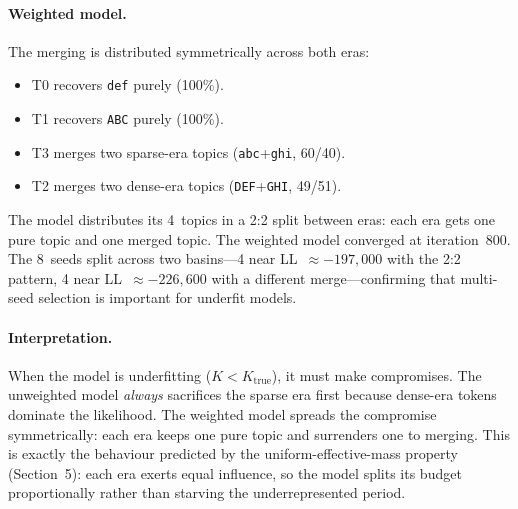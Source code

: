 \documentclass[11pt]{article}
\begin{document}
\paragraph{Weighted model.}
The merging is distributed symmetrically across both eras:
\begin{itemize}
\item T0 recovers \texttt{def} purely (100\%).
\item T1 recovers \texttt{ABC} purely (100\%).
\item T3 merges two sparse-era topics (\texttt{abc}\;+\;\texttt{ghi}, 60/40).
\item T2 merges two dense-era topics (\texttt{DEF}\;+\;\texttt{GHI}, 49/51).
\end{itemize}
The model distributes its 4~topics in a 2:2 split between eras: each era gets one pure topic and one merged topic.
The weighted model converged at iteration~800.
The 8~seeds split across two basins---4 near LL~$\approx -197{,}000$ with the 2:2 pattern, 4 near LL~$\approx -226{,}600$ with a different merge---confirming that multi-seed selection is important for underfit models.

\paragraph{Interpretation.}
When the model is underfitting ($K < K_{\text{true}}$), it must make compromises.
The unweighted model \emph{always} sacrifices the sparse era first because dense-era tokens dominate the likelihood.
The weighted model spreads the compromise symmetrically: each era keeps one pure topic and surrenders one to merging.
This is exactly the behaviour predicted by the uniform-effective-mass property (Section~5): each era exerts equal influence, so the model splits its budget proportionally rather than starving the underrepresented period.
\end{document}
